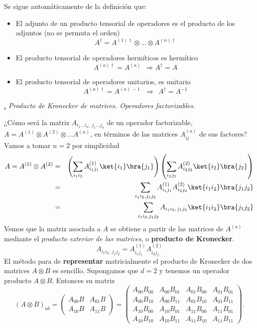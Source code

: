 \documentclass[a4paper,11pt]{book} %
\numberwithin{equation}{chapter}
\def\subsubiContadorIt{\par\addtocounter{subsubsection}{1}\underline{\it\thesubsubsection.}\hskip0.5cm \setcounter{subsubsubsectionIt}{0}}
\newcommand{\SubsubiIt}[1]{
		\subsubiContadorIt \textit{#1}
	}
\newcounter{subsubsubsectionIt}[subsubsection]
\begin{document}
Se sigue automáticamente de la definición que:
\begin{itemize}
	\item El adjunto de un producto tensorial de operadores es el producto de los adjuntos (no se permuta el orden)
		\begin{equation}
		A^\dagger = A^{(1)\dagger} \otimes ... \otimes A^{(n)\dagger}
		\end{equation}
	\item El producto tensorial de operadores hermíticos es hermítico
	$$ 
	A^{(a)\dagger} = A^{(a)} ~~\Longrightarrow A^{\dagger} = A 
	$$
	\item El producto tensorial de operadores unitarios, es unitario
	$$ 
	A^{(a)\dagger} = A^{(a)\, -1} \,  ~~\Longrightarrow ~~A^{\dagger} = A^{-1} 
	$$
\end{itemize}



			\SubsubiIt{Producto de Kronecker de matrices. Operadores factorizables.}

¿Cómo será la matriz $A_{i_1...i_n, \, j_1...j_n}$ de un operador factorizable, $ A = A^{(1)}\otimes A^{(2)} \otimes ...A^{(n)}$, en términos de las matrices  $ A^{(a)}_{ij}$ de sus factores? Vamos a tomar  $n=2$ por simplicidad
\begin{eqnarray}
A = A^{(1)}\otimes  A^{(2)} &=&\left( \sum_{i_1i_2}A^{(1)}_{i_1 j_1} \ket{i_1}\bra{j_1}\right)\left( \sum_{i_2j_2}A^{(2)}_{i_2 j_2} \ket{i_2}\bra{j_2}\right)\\
&=& \sum_{i_1 i_2 , j_1 j_2} A^{(1)}_{i_1 j_1}A^{(2)}_{i_2 j_2}\ket{i_1 i_2}\bra{j_1j_2} \\
&=& \sum_{i_1 i_2 , j_1 j_2} A_{i_1i_2,\, j_1j_2}\ket{i_1 i_2}\bra{j_1j_2}
\end{eqnarray}
Vemos que la matriz asociada a $A$ se obtiene  a partir de las matrices de $A^{(a)}$ mediante el  \textit{producto exterior de las matrices}, o \textbf{producto de Kronecker}.
	\begin{equation}
	  A_{i_1i_2,\,j_1j_2} = A^{(1)}_{i_1j_1}A^{(2)}_{i_2 j_2} 
	\end{equation}
El método para de \textbf{representar} matricialmente el producto de Kronecker de dos matrices $A\otimes B$ es sencillo. Supongamos que $d=2$ y tenemos un operador producto $A\otimes B$. Entonces su matriz 
	\begin{equation}
(A\otimes B)_{ab} = \begin{pmatrix} A_{00}B & A_{01}B \\ A_{10}B & A_{11}B \end{pmatrix} = \begin{pmatrix} A_{00}B_{00} & A_{00}B_{01} & A_{01}B_{00} & A_{01}B_{01} \\
                A_{00}B_{10} & A_{00}B_{11} & A_{01}B_{10} & A_{01}B_{11} \\
                A_{10}B_{00} & A_{10}B_{01} & A_{11}B_{00} & A_{11}B_{01} \\
                A_{10}B_{10} & A_{10}B_{11} & A_{11}B_{10} & A_{11}B_{11} \end{pmatrix}.
	\end{equation}
\end{document}
